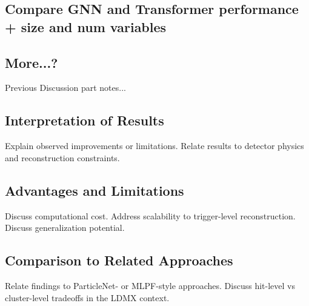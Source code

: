 \subsection{Compare GNN and Transformer performance + size and num variables}



\subsection{More...?}




Previous Discussion part notes...


\subsection{Interpretation of Results}
Explain observed improvements or limitations.
Relate results to detector physics and reconstruction constraints.

\subsection{Advantages and Limitations}
Discuss computational cost.
Address scalability to trigger-level reconstruction.
Discuss generalization potential.

\subsection{Comparison to Related Approaches}
Relate findings to ParticleNet- or MLPF-style approaches.
Discuss hit-level vs cluster-level tradeoffs in the LDMX context.

